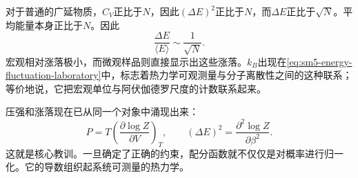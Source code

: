 对于普通的广延物质，\(C_V\)正比于\(N\)，因此\((\Delta E)^2\)正比于\(N\)，而\(\Delta E\)正比于\(\sqrt{N}\)。平均能量本身正比于\(N\)。因此
\begin{equation}
 \frac{\Delta E}{\langle E\rangle}\sim\frac{1}{\sqrt{N}}.
 \label{eq:sm5-relative-fluctuation-scaling}
\end{equation}
宏观相对涨落极小，而微观样品则直接显示出这些涨落。\(k_B\)出现在\eqref{eq:sm5-energy-fluctuation-laboratory}中，标志着热力学可观测量与分子离散性之间的这种联系；等价地说，它把宏观单位与阿伏伽德罗尺度的计数联系起来。

压强和涨落现在已从同一个对象中涌现出来：
\[
 P=T\left(\frac{\partial\log Z}{\partial V}\right)_T,
 \qquad
 (\Delta E)^2=\frac{\partial^2\log Z}{\partial\beta^2}.
\]
这就是核心教训。一旦确定了正确的约束，配分函数就不仅仅是对概率进行归一化。它的导数组织起系统可测量的热力学。